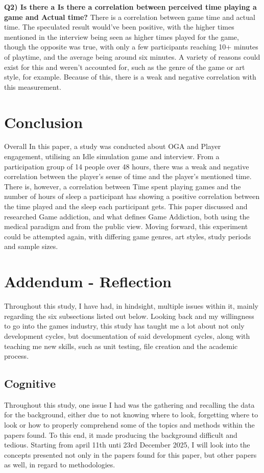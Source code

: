 \documentclass[conference]{IEEEtran}
\begin{document}
 \textbf{Q2) Is there a Is there a correlation between perceived time playing a game and Actual time?}
There is a correlation between game time and actual time. The speculated result would've been positive, with the higher times mentioned in the interview being seen as higher times played for the game, though the opposite was true, with only a few participants reaching 10+ minutes of playtime, and the average being around six minutes. A variety of reasons could exist for this and weren't accounted for, such as the genre of the game or art style, for example. Because of this, there is a weak and negative correlation with this measurement.

\section{Conclusion}
Overall In this paper, a study was conducted about OGA and Player engagement, utilising an Idle simulation game and interview. From a participation group of 14 people over 48 hours, there was a weak and negative correlation between the player's sense of time and the player's mentioned time. There is, however, a correlation between Time spent playing games and the number of hours of sleep a participant has showing a positive correlation between the time played and the sleep each participant gets. This paper discussed and researched Game addiction,  and what defines Game Addiction, both using the medical paradigm and from the public view. Moving forward, this experiment could be attempted again, with differing game genres, art styles, study periods and sample sizes.


 
\section {Addendum - Reflection}
Throughout this study, I have had, in hindsight, multiple issues within it, mainly regarding the six subsections listed out below. Looking back and my willingness to go into the games industry, this study has taught me a lot about not only development cycles, but documentation of said development cycles, along with teaching me new skills, such as unit testing, file creation and the academic process.
\subsection{Cognitive}
Throughout this study, one issue I had was the gathering and recalling the data for the background, either due to not knowing where to look, forgetting where to look or how to properly comprehend some of the topics and methods within the papers found. To this end, it made producing the background difficult and tedious. Starting from april 11th unti 23rd December 2025, I will look into the concepts presented not only in the papers found for this paper, but other papers as well, in regard to methodologies. 
\end{document}
